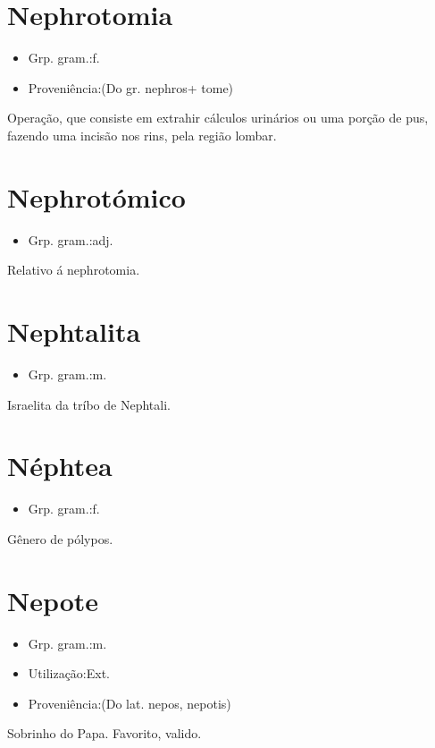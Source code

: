 \section{Nephrotomia}
\begin{itemize}
\item {Grp. gram.:f.}
\end{itemize}
\begin{itemize}
\item {Proveniência:(Do gr. \textunderscore nephros\textunderscore  + \textunderscore tome\textunderscore )}
\end{itemize}
Operação, que consiste em extrahir cálculos urinários ou uma porção de pus, fazendo uma incisão nos rins, pela região lombar.
\section{Nephrotómico}
\begin{itemize}
\item {Grp. gram.:adj.}
\end{itemize}
Relativo á nephrotomia.
\section{Nephtalita}
\begin{itemize}
\item {Grp. gram.:m.}
\end{itemize}
Israelita da tríbo de Nephtali.
\section{Néphtea}
\begin{itemize}
\item {Grp. gram.:f.}
\end{itemize}
Gênero de pólypos.
\section{Nepote}
\begin{itemize}
\item {Grp. gram.:m.}
\end{itemize}
\begin{itemize}
\item {Utilização:Ext.}
\end{itemize}
\begin{itemize}
\item {Proveniência:(Do lat. \textunderscore nepos\textunderscore , \textunderscore nepotis\textunderscore )}
\end{itemize}
Sobrinho do Papa.
Favorito, valido.

